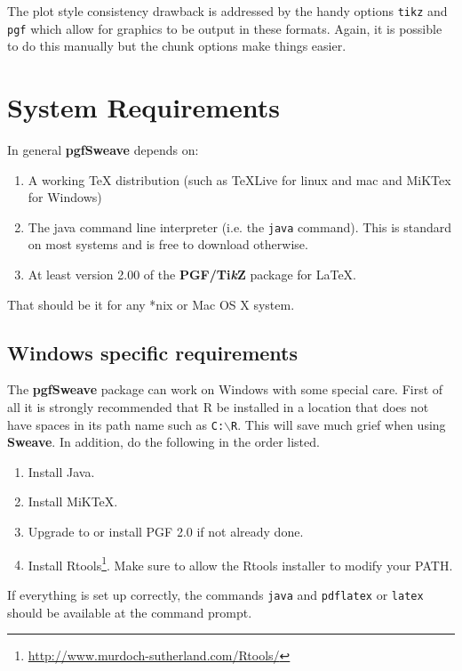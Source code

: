 \documentclass{article}
\newcommand{\code}{\texttt}
\newcommand{\pkg}{\textbf}
\begin{document}
The plot style consistency drawback is addressed by the handy options \code{tikz} and \code
{pgf} which allow for graphics to be output in these formats. Again, it is possible to do this 
manually but the chunk options make things easier. 


\section{System Requirements}
In general \pkg{pgfSweave} depends on:
\begin{enumerate}
\item A working \TeX{} distribution (such as TeXLive for linux and mac and MiKTex for Windows)
\item The java command line interpreter (i.e. the \code{java} command).  This is standard on most systems and is free to download otherwise. 
\item At least version 2.00 of the \pkg{PGF/Ti\textit{k}Z} package for \LaTeX{}. 
\end{enumerate}

That should be it for any *nix or Mac OS X system. 

\subsection{Windows specific requirements}

The \pkg{pgfSweave} package can work on Windows with some special care.  First of all it is strongly recommended that R be installed in a location that does not have spaces in its path name such as \texttt{C:$\backslash$R}.  This will save much grief when using \pkg{Sweave}. In addition, do the following in the order listed. 

\begin{enumerate}
\item Install Java. 
\item Install MiK\TeX{}. 
\item Upgrade to or install PGF 2.0 if not already done. 
\item Install Rtools\footnote{\url{http://www.murdoch-sutherland.com/Rtools/}}. Make sure to allow the Rtools installer to modify your PATH.  
\end{enumerate}

If everything is set up correctly, the commands \code{java} and \code{pdflatex} or \code{latex} should be available at the command prompt.    
\end{document}
